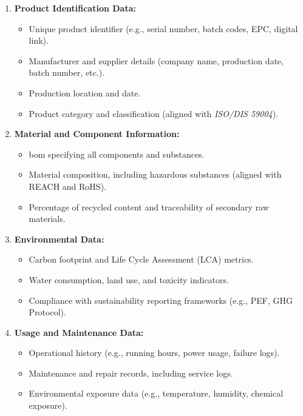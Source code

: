 \begin{enumerate}[itemsep=0.5\baselineskip]
    \item \textbf{Product Identification Data:}  
    \vspace{5pt}
    \begin{itemize}
        \item Unique product identifier (e.g., serial number, batch codes, EPC, digital link).
        \item Manufacturer and supplier details (company name, production date, batch number, etc.).
        \item Production location and date.
        \item Product category and classification (aligned with \textit{ISO/DIS 59004}).
    \end{itemize}

    \item \textbf{Material and Component Information:}  
    \vspace{5pt}
    \begin{itemize}
        \item \ac{bom} specifying all components and substances.
        \item Material composition, including hazardous substances (aligned with REACH and RoHS).
        \item Percentage of recycled content and traceability of secondary raw materials.
    \end{itemize}

    \item \textbf{Environmental Data:}  
    \vspace{5pt}
    \begin{itemize}
        \item Carbon footprint and Life Cycle Assessment (LCA) metrics.
        \item Water consumption, land use, and toxicity indicators.
        \item Compliance with sustainability reporting frameworks (e.g., PEF, GHG Protocol).
    \end{itemize}

    \item \textbf{Usage and Maintenance Data:}  
    \vspace{5pt}
    \begin{itemize}
        \item Operational history (e.g., running hours, power usage, failure logs).
        \item Maintenance and repair records, including service logs.
        \item Environmental exposure data (e.g., temperature, humidity, chemical exposure).
    \end{itemize}


\end{enumerate}
